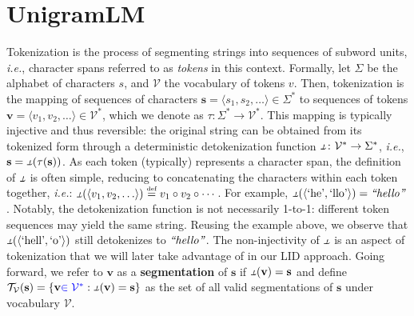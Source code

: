 \documentclass{article}
\makeatletter
\newcommand{\ie}{\emph{i.e.}\@\xspace}
\newcommand{\chspan}[1]{\text{\rmfamily\textit{``#1''}}\xspace}
\newcommand{\tokenprint}[1]{\text{`#1'}}
\newcommand{\corrrev}[1]{\textcolor{blue}{#1}}
\newcommand{\note}[4][]{\todo[author=#2,color=#3,size=\scriptsize,fancyline,caption={},#1]{#4}} %
\newcommand{\pietro}[2][]{\note[#1]{pietro}{green!40}{#2}}
\newcommand{\defn}[1]{\textbf{#1}}
\newcommand{\defeq}{\mathrel{\stackrel{\textnormal{\tiny def}}{=}}}
\newcommand{\token}{v}
\newcommand{\stringunit}{s}
\newcommand{\str}{\mathbf{\stringunit}}
\newcommand{\tokens}{\mathbf{\token}}
\newcommand{\stralphabet}{\Sigma}
\newcommand{\vocab}{\mathcal{V}}
\newcommand{\detokfunc}{\ensuremath{\rotatebox[origin=c]{180}{$\tokfunc$}}}
\newcommand{\tokfunc}{\tau}
\newcommand{\allsegmentations}{\mathcal{T}}
\makeatother
\begin{document}
\section{UnigramLM}

Tokenization is the process of segmenting strings into sequences of subword units, \ie, character spans referred to as \emph{tokens} in this context. %
Formally, let $\stralphabet$ be the alphabet of characters $\stringunit$, and $\vocab$ the vocabulary of tokens $\token$. 
Then, tokenization is the mapping of sequences of characters $\str=\langle \stringunit_1,\stringunit_2,\dots\rangle \in\stralphabet^*$ to sequences of tokens 
$\tokens=\langle \token_1,\token_2,\dots\rangle\in\vocab^*$, which we denote as 
$\tokfunc\colon \stralphabet^* \rightarrow \vocab^*$. This mapping is typically injective and thus reversible: the original string can be obtained from its tokenized form through a deterministic detokenization function $\detokfunc\colon \vocab^* \rightarrow \stralphabet^*$, \ie, $\str=\detokfunc(\tokfunc(\str))$. As each token (typically) represents a character span, the definition of $\detokfunc$ is often simple, reducing to concatenating the characters within each token together, \ie: $\detokfunc(\langle\token_1, \token_2, \ldots\rangle) \defeq \token_1 \circ \token_2 \circ \cdots$. 
For example, $\detokfunc(\langle\tokenprint{he},\tokenprint{llo}\rangle) = \chspan{hello}$. Notably, the detokenization function is not necessarily 1-to-1: different token sequences may yield the same string. Reusing the example above, we observe that $\detokfunc(\langle\tokenprint{hell},\tokenprint{o}\rangle)$ still detokenizes to $\chspan{hello}$.
The non-injectivity of $\detokfunc$ is an aspect of tokenization that we will later take advantage of in our LID approach. 
Going forward, we refer to $\tokens$ as a \defn{segmentation} of $\str$ if $\detokfunc(\tokens) = \str$ and define $\allsegmentations_{\vocab}(\str) = \{\tokens \corrrev{\in \vocab^*} : \detokfunc(\tokens) = \str\}$ as the set of all valid segmentations of $\str$ under vocabulary $\vocab$.
\end{document}
